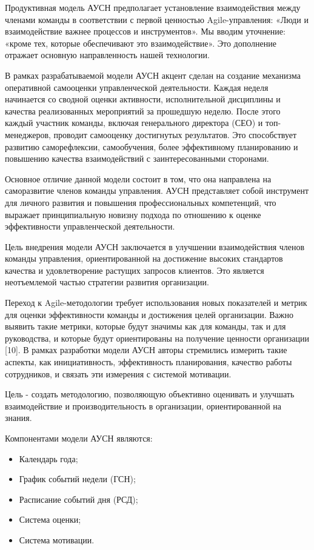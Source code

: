 \begin{multicols}{2}

Продуктивная модель АУСН предполагает установление взаимодействия между
членами команды в соответствии с первой ценностью Agile-управления:
«Люди и взаимодействие важнее процессов и инструментов». Мы вводим
уточнение: «кроме тех, которые обеспечивают это взаимодействие». Это
дополнение отражает основную направленность нашей технологии.

В рамках разрабатываемой модели АУСН акцент сделан на создание механизма
оперативной самооценки управленческой деятельности. Каждая неделя
начинается со сводной оценки активности, исполнительной дисциплины и
качества реализованных мероприятий за прошедшую неделю. После этого
каждый участник команды, включая генерального директора (СЕО) и
топ-менеджеров, проводит самооценку достигнутых результатов. Это
способствует развитию саморефлексии, самообучения, более эффективному
планированию и повышению качества взаимодействий с заинтересованными
сторонами.

Основное отличие данной модели состоит в том, что она направлена на
саморазвитие членов команды управления. АУСН представляет собой
инструмент для личного развития и повышения профессиональных
компетенций, что выражает принципиальную новизну подхода по отношению к
оценке эффективности управленческой деятельности.

Цель внедрения модели АУСН заключается в улучшении взаимодействия членов
команды управления, ориентированной на достижение высоких стандартов
качества и удовлетворение растущих запросов клиентов. Это является
неотъемлемой частью стратегии развития организации.

Переход к Agile-методологии требует использования новых показателей и
метрик для оценки эффективности команды и достижения целей организации.
Важно выявить такие метрики, которые будут значимы как для команды, так
и для руководства, и которые будут ориентированы на получение ценности
организации {[}10{]}. В рамках разработки модели АУСН авторы стремились
измерить такие аспекты, как инициативность, эффективность планирования,
качество работы сотрудников, и связать эти измерения с системой
мотивации.

Цель - создать методологию, позволяющую объективно оценивать и улучшать
взаимодействие и производительность в организации, ориентированной на
знания.

Компонентами модели АУСН являются:


\begin{itemize}[left=1cm]
\item
  Календарь года;
\item
  График событий недели (ГСН);
\item
  Расписание событий дня (РСД);
\item
  Система оценки;
\item
  Система мотивации.
\end{itemize}


\end{multicols}
